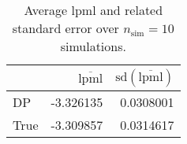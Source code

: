 \begin{table}[H]

\caption{Average lpml and related standard error over $n_{\text{sim}} = 10$ simulations.}
\centering
\begin{tabular}[t]{lrr}
\toprule
  & $\overbar{\text{lpml}}$ & $\text{sd}(\overbar{\text{lpml}})$\\
\midrule
DP & -3.326135 & 0.0308001\\
True & -3.309857 & 0.0314617\\
\bottomrule
\end{tabular}
\end{table}